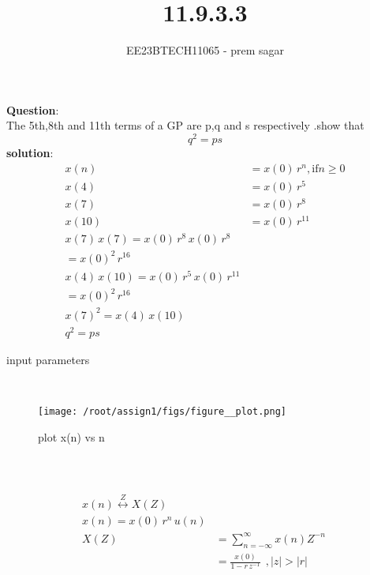 \documentclass[journal,12pt,twocolumn]{IEEEtran}
\theoremstyle{remark}
\begin{document}

\vspace{3cm}

\title{11.9.3.3}
\author{EE23BTECH11065 - prem sagar}
\maketitle
\newpage

\bigskip 

\renewcommand{\thefigure}{\theenumi}
\renewcommand{\thetable}{\theenumi}
\textbf{Question}:\\ The 5th,8th and 11th terms of a GP are p,q and s respectively .show that \[q^2=ps\]
\textbf{solution}:
\begin{align}
x(n)&= x(0)\,r^{n}, \text{if} n \geq 0
\\x(4)&=x(0)\,r^5
\\x(7)&=x(0)\,r^8
\\x({10})&=x(0)\,r^{11}
\\x(7)\,x(7)=x(0)\,r^8\,x(0)\,r^8
     \\ =x(0)^2\,r^{16}
\\x(4)\,x({10})=x(0)\,r^5\,x(0)\,r^{11}
       \\=x(0)^2\,r^{16}
\\x(7)^2=x(4)\,x({10})
\\q^2=ps
\end{align}
\begin{table}[!ht]
   \centering
      
    \caption{input parameters}
    \label{tab:11.9.3}
 \end{table}    
\\\begin{figure}
    \centering
    \texttt{[image: /root/assign1/figs/figure\_\_plot.png]}
    \caption{plot x(n) vs n}
    \label{fig:enter-label}
\end{figure}\\
\\\begin{align}
\\x(n)\overset{Z}{\longleftrightarrow}   X(Z)
\\x(n)=x(0)\,r^n\,u(n)
\\X(Z)&=\sum_{n=-\infty}^{\infty}x(n) Z^{-n}\
     \\ &= \frac{x(0)}{1-r\,z^{-1}}\: \:,|z|>|r| \end{align}   
\end{document}
